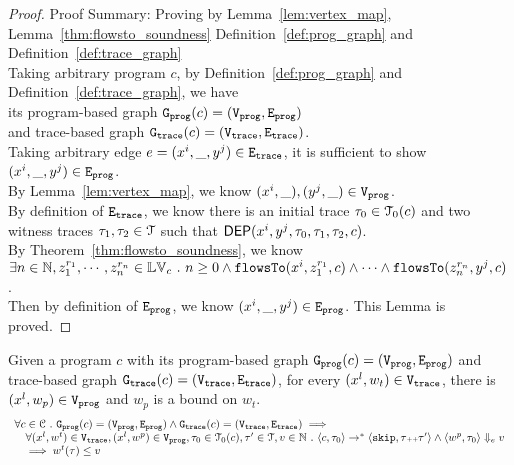 \begin{proof}
Proof Summary: Proving by Lemma~\ref{lem:vertex_map}, Lemma~\ref{thm:flowsto_soundness} Definition~\ref{def:prog_graph} and Definition~\ref{def:trace_graph}
\\
Taking arbitrary program $c$,
by Definition~\ref{def:prog_graph} and Definition~\ref{def:trace_graph}, 
we have   
\\
its program-based graph $\mathtt{{G_{prog}}}({c}) = (\mathtt{{V_{prog}}}, \mathtt{{E_{prog}}})$ 
\\
and 
trace-based graph $\mathtt{{G_{trace}}}({c}) = (\mathtt{{V_{trace}}}, \mathtt{{E_{trace}}})$.
\\
Taking arbitrary edge $e = (x^i, \_, y^j) \in \mathtt{{E_{trace}}}$, it is sufficient to show $(x^i,  \_, y^j) \in \mathtt{{E_{prog}}}$.
\\
By Lemma~\ref{lem:vertex_map}, we know $(x^i, \_), (y^j, \_) \in \mathtt{{V_{prog}}}$.
\\
By definition of $\mathtt{{E_{trace}}}$, we know there is an initial trace $\mathtt{\tau}_0 \in \mathcal{T}_0(c)$ and 
two witness traces $\mathtt{\tau}_1, \mathtt{\tau}_2 \in \mathcal{T}$
such that $\mathsf{DEP}(x^i, y^j, \mathtt{\tau}_0, \mathtt{\tau}_1, \mathtt{\tau}_2, c)$.
\\
By Theorem~\ref{thm:flowsto_soundness}, we know $ \exists n \in \mathbb{N}, z_1^{r_1}, \cdots, z_n^{r_n} \in \mathbb{LV}_{{c}} ~.~ 
n \geq 0 \land
\mathtt{flowsTo}(x^i,  z_1^{r_1}, c) 
\land \cdots \land \mathtt{flowsTo}(z_n^{r_n}, y^j, c) $.
\\
Then by definition of $\mathtt{{E_{prog}}}$, we know $(x^i, \_, y^j) \in \mathtt{{E_{prog}}}$. This Lemma is proved.
\end{proof}
%
\begin{lem}
	\label{lem:vertexweights_map}
	Given a program $c$ with its
	program-based graph $\mathtt{{G_{prog}}}({c}) = (\mathtt{{V_{prog}}}, \mathtt{{E_{prog}}})$
	and 
	trace-based graph $\mathtt{{G_{trace}}}({c}) = (\mathtt{{V_{trace}}}, \mathtt{{E_{trace}}})$,
	for every $(x^l, w_{t}) \in \mathtt{{V_{trace}}}$, there is $(x^l, w_{p}) \in \mathtt{{V_{prog}}}$ and 
	$w_{p}$ is a bound on $w_t$.
	\[
		\begin{array}{l}
			\forall c \in \mathcal{C} 
			 ~.~ 
			 \mathtt{{G_{prog}}}({c}) = (\mathtt{{V_{prog}}}, \mathtt{{E_{prog}}})
			\land 
			\mathtt{{G_{trace}}}({c}) = (\mathtt{{V_{trace}}}, \mathtt{{E_{trace}}})
			\implies
			\\ \quad
			\forall (x^l, w^{t}) \in \mathtt{{V_{trace}}},
			(x^l, w^{p}) \in \mathtt{{V_{prog}}}, 
			\mathtt{\tau}_0 \in \mathcal{T}_0(c), 
			\mathtt{\tau}' \in \mathcal{T}, v \in \mathbb{N} ~.~
			\langle {c}, \mathtt{\tau}_0 \rangle \to^{*} \langle \mathtt{skip}, \mathtt{\tau}{\scriptscriptstyle ++}\mathtt{\tau}' \rangle 
			\land 
			\langle w^{p}, \mathtt{\tau}_0 \rangle \Downarrow_e v
			\\ \quad
			\implies
			w^{t}(\mathtt{\tau}) \leq v
		\end{array}
		\]
	\end{lem}

